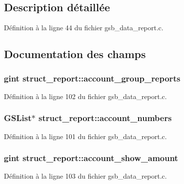 \subsection{Description détaillée}


Définition à la ligne 44 du fichier gsb\_\-data\_\-report.c.



\subsection{Documentation des champs}
\subsubsection[{account\_\-group\_\-reports}]{\setlength{\rightskip}{0pt plus 5cm}gint {\bf struct\_\-report::account\_\-group\_\-reports}}\label{structstruct__report_a41f8ab65c560384904e74bf9a0380126}


Définition à la ligne 102 du fichier gsb\_\-data\_\-report.c.

\subsubsection[{account\_\-numbers}]{\setlength{\rightskip}{0pt plus 5cm}GSList$\ast$ {\bf struct\_\-report::account\_\-numbers}}\label{structstruct__report_a9ca947aae3db879d9f5ee6bdd9243eba}


Définition à la ligne 101 du fichier gsb\_\-data\_\-report.c.

\subsubsection[{account\_\-show\_\-amount}]{\setlength{\rightskip}{0pt plus 5cm}gint {\bf struct\_\-report::account\_\-show\_\-amount}}\label{structstruct__report_a5744bf01ebd31a7afca8d988314bbaa4}


Définition à la ligne 103 du fichier gsb\_\-data\_\-report.c.

